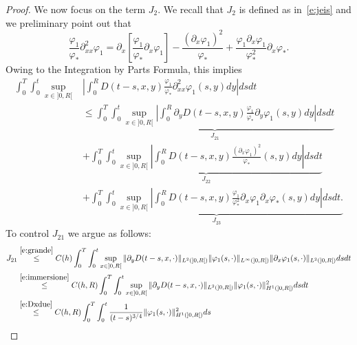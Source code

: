 \documentclass[11pt,leqno]{amsart}
\numberwithin{equation}{section}
\begin{document}
\begin{proof}
We now focus on the term $J_2$. We recall that $J_2$ is defined as in~\eqref{e:jeis} and we preliminary point out that
$$
   \frac{{\varphi}_1 }{{\varphi}_\ast} {\partial_{xx}^2} {\varphi}_1 = {\partial_x } \left[
   \frac{{\varphi}_1 }{{\varphi}_\ast} {\partial_x } {\varphi}_1
   \right] -
   \frac{({\partial_x } {\varphi}_1)^2}{{\varphi}_\ast} +
   \frac{{\varphi}_1 {\partial_x } {\varphi}_1}{{\varphi}^2_\ast}
   {\partial_x } {\varphi}_\ast.
$$
Owing to the Integration by Parts Formula, this implies 
\begin{equation}
  \label{e:geiduescarico}
  \begin{split}
    \int_0^T \int_0^t \sup_{x \in ]0, R[} & \left| \int_0^R \! \! \!
      D(t-s, x, y) \frac{{\varphi}_1 }{{\varphi}_\ast} {\partial_{xx}^2} {\varphi}_1(s, y) dy
    \right| ds dt 
    \\
    & \leq \underbrace{ \int_0^T \int_0^t \sup_{x \in
        ]0, R[} \left| \int_0^R \! \! \! \partial_y D(t-s, x, y) \frac{{\varphi}_1
        }{{\varphi}_\ast} \partial_y {\varphi}_1(s, y) dy \right| ds
      dt  }_{J_{21}} 
    \\
    & + \underbrace{ \int_0^T \int_0^t \sup_{x \in ]0, R[} \left|
        \int_0^R \! \! \! D(t-s, x, y) \frac{( {\partial_x } {\varphi}_1)^2
        }{{\varphi}_\ast} (s, y) dy \right| ds
      dt }_{J_{22}} 
    \\
    & + \underbrace{ \int_0^T \int_0^t \sup_{x \in ]0, R[} \left|
        \int_0^R \! \! \! D(t-s, x, y) \frac{ {\varphi}_1 }{{\varphi}^2_\ast}
        {\partial_x } {\varphi}_1 {\partial_x } {\varphi}_\ast (s, y) dy \right| ds dt .}_{J_{23}}
  \end{split}
\end{equation} 
To control $J_{21}$ we argue as follows:
\begin{equation}
  \label{e:geidueuno}
  \begin{split}
    J_{21} & \stackrel{\eqref{e:grande}}{\leq} C(h) \int_0^T \int_0^t
    \sup_{x \in ]0, R[} \| \partial_y D(t-s, x, \cdot) \|_{L^2(]0,R[)}
    \| {\varphi}_1(s, \cdot) \|_{L^\infty (]0, R[ )} \| {\partial_x } {\varphi}_1(s,
    \cdot) \|_{L^2 (]0, R[)} ds
    dt
    \\
    & \stackrel{\eqref{e:immersione}}{\leq} C(h, R) \int_0^T \int_0^t
    \sup_{x \in ]0, R[} \| \partial_y D(t-s, x, \cdot) \|_{L^2(]0,R[)} \|
    {\varphi}_1(s, \cdot) \|^2_{H^1 (]0, R[ )} ds
    dt
    \\
    & \stackrel{\eqref{e:Dxdue}}{\leq} C( h,R) \int_0^T \int_0^t
    \frac{1}{(t-s)^{3/4}} \| {\varphi}_1(s, \cdot) \|^2_{H^1 (]0, R[ )} ds

\end{split}
\end{equation}
\end{proof}
\end{document}
